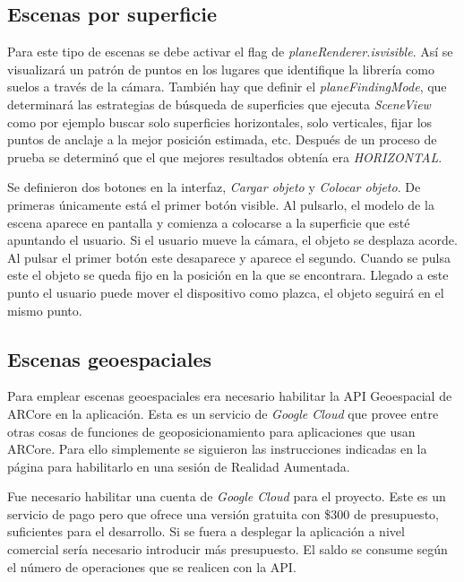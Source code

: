 \subsection{Escenas por superficie}

Para este tipo de escenas se debe activar el flag de \textit{planeRenderer.isvisible}. Así se visualizará un patrón de puntos en los lugares que identifique la librería como suelos a través de la cámara. También hay que definir el \textit{planeFindingMode}, que determinará las estrategias de búsqueda de superficies que ejecuta \textit{SceneView} como por ejemplo buscar solo superficies horizontales, solo verticales, fijar los puntos de anclaje a la mejor posición estimada, etc. Después de un proceso de prueba se determinó que el que mejores resultados obtenía era \textit{HORIZONTAL}.


Se definieron dos botones en la interfaz, \textit{Cargar objeto} y \textit{Colocar objeto}. De primeras únicamente está el primer botón visible. Al pulsarlo, el modelo de la escena aparece en pantalla y comienza a colocarse a la superficie que esté apuntando el usuario. Si el usuario mueve la cámara, el objeto se desplaza acorde. Al pulsar el primer botón este desaparece y aparece el segundo. Cuando se pulsa este el objeto se queda fijo en la posición en la que se encontrara. Llegado a este punto el usuario puede mover el dispositivo como plazca, el objeto seguirá en el mismo punto.


\subsection{Escenas geoespaciales}

Para emplear escenas geoespaciales era necesario habilitar la API Geoespacial\cite{geospatialapi} de ARCore en la aplicación. Esta es un servicio de \textit{Google Cloud} que provee entre otras cosas de funciones de geoposicionamiento para aplicaciones que usan ARCore. Para ello simplemente se siguieron las instrucciones indicadas en la página para habilitarlo en una sesión de Realidad Aumentada.

Fue necesario habilitar una cuenta de \textit{Google Cloud} para el proyecto. Este es un servicio de pago pero que ofrece una versión gratuita con \$300 de presupuesto, suficientes para el desarrollo. Si se fuera a desplegar la aplicación a nivel comercial sería necesario introducir más presupuesto. El saldo se consume según el número de operaciones que se realicen con la API.

